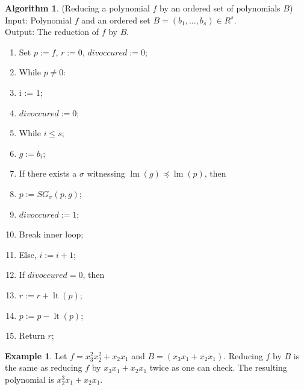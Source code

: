 \documentclass{amsart}
\theoremstyle{definition}
\newtheorem{example}[theorem]{Example}
\newtheorem{algorithm}[theorem]{Algorithm}
\theoremstyle{remark}
\numberwithin{equation}{section}
\newcommand{\lm}{\operatorname{lm}}
\newcommand{\lt}{\operatorname{lt}}
\newcommand{\<}{\langle}
\renewcommand{\>}{\rangle}
\begin{document}
\begin{algorithm}\label{reducefbyg}\mbox{}(Reducing a polynomial $f$ by an ordered  set of polynomials $B$)\\
Input: Polynomial $f$ and an ordered set $B = (b_1,\ldots,b_s) \in R^s$.\\
Output: The reduction of $f$ by $B$. 
\begin{enumerate}
\item Set $p := f$, $r := 0$, $divoccured := 0$;
\item While $p \neq 0$:
\item[]\hspace{0.5cm} i := 1;
\item[]\hspace{0.5cm} $divoccured := 0$;

\item[]\hspace{0.5cm} While $i \leq s$;
\item[]\hspace{1.0cm} $g := b_i$;
\item[]\hspace{1.0cm} If there exists a $\sigma$ witnessing $\lm(g) \preceq \lm(p)$, then
\item[]\hspace{1.5cm} $p := SG_{\sigma}(p,g)$;
\item[]\hspace{1.5cm} $divoccured := 1$;
\item[]\hspace{1.5cm} Break inner loop;
\item[]\hspace{1.0cm} Else, $i := i + 1$;
\item[]\hspace{0.5cm} If $divoccured = 0$, then 
\item[]\hspace{1.0cm} $r := r + \lt(p)$;
\item[]\hspace{1.0cm} $p := p - \lt(p)$;
\item Return $r$;
\end{enumerate}
\end{algorithm}

\begin{example}
Let $f = x_3^2 x_2^2+x_2 x_1$ and $B = (x_3 x_1+x_2 x_1)$.  Reducing $f$ by
$B$ is the same as reducing $f$ by $x_3 x_1+x_2 x_1$ twice as one can check.  The
resulting polynomial is $x_2^3 x_1 + x_2 x_1$.  
\end{example}
\end{document}
